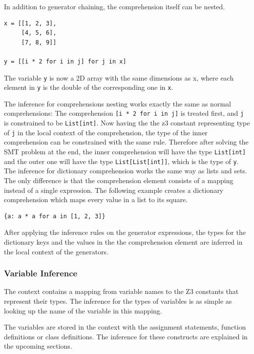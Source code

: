 In addition to generator chaining, the comprehension itself can be nested.
\begin{lstlisting}
x = [[1, 2, 3],
     [4, 5, 6],
     [7, 8, 9]]
	 
y = [[i * 2 for i in j] for j in x]	 
\end{lstlisting}
The variable \lstinline|y| is now a 2D array with the same dimensions as x, where each element in \lstinline|y| is the double of the corresponding one in \lstinline|x|.

The inference for comprehensions nesting works exactly the same as normal comprehensions: The comprehension \lstinline|[i * 2 for i in j]| is treated first, and \lstinline|j| is constrained to be \lstinline|List[int]|. Now having the the z3 constant representing type of \lstinline|j| in the local context of the comprehension, the type of the inner comprehension can be constrained with the same rule. Therefore after solving the SMT problem at the end, the inner comprehension will have the type \lstinline|List[int]| and the outer one will have the type \lstinline|List[List[int]]|, which is the type of \lstinline|y|.\\

The inference for dictionary comprehension works the same way as lists and sets. The only difference is that the comprehension element consists of a mapping instead of a single expression. The following example creates a dictionary comprehension which maps every value in a list to its square.
\begin{lstlisting}
{a: a * a for a in [1, 2, 3]}
\end{lstlisting}

After applying the inference rules on the generator expressions, the types for the dictionary keys and the values in the the comprehension element are inferred in the local context of the generators.

\subsubsection{Variable Inference}
The context contains a mapping from variable names to the Z3 constants that represent their types. The inference for the types of variables is as simple as looking up the name of the variable in this mapping.

The variables are stored in the context with the assignment statements, function definitions or class definitions. The inference for these constructs are explained in the upcoming sections.

